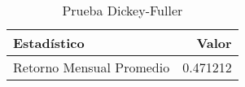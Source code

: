 \begin{table}[H]
\label{tab:dickey_fuller}
\centering
\begin{tabular}{lr}
\toprule
Estad\'istico & Valor \\
\midrule
Retorno Mensual Promedio & 0.471212 \\
\bottomrule
\end{tabular}
\caption{Prueba Dickey-Fuller}
\end{table}
